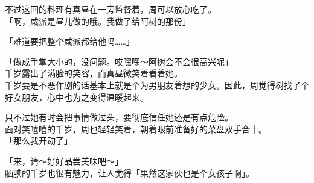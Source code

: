 不过这回的料理有真昼在一旁监督着，周可以放心吃了。\\

「啊，咸派是昼儿做的哦。我做了给阿树的那份」

「难道要把整个咸派都给他吗……」

「做成手掌大小的，没问题。哎嘿嘿～阿树会不会很高兴呢」\\

千岁露出了满脸的笑容，而真昼微笑着看着她。\\

千岁要是不恶作剧的话基本上就是个为男朋友着想的少女。因此，周觉得树找了个好女朋友，心中也为之变得温暖起来。

只不过她有时会把事情做过头，要彻底信任她还是有点危险。\\

面对笑嘻嘻的千岁，周也轻轻笑着，朝着眼前准备好的菜盘双手合十。\\

「那么我开动了」

「来，请～好好品尝美味吧～」\\

腼腆的千岁也很有魅力，让人觉得「果然这家伙也是个女孩子啊」。
